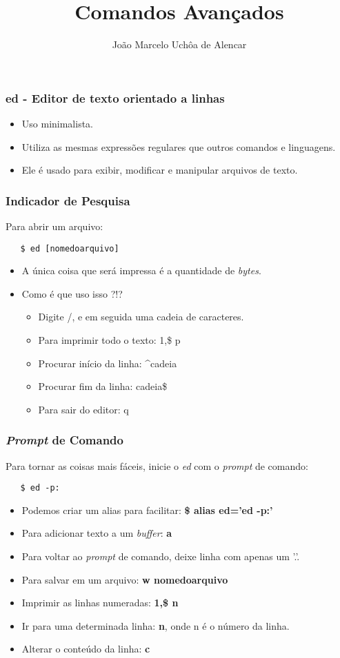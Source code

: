 \documentclass{beamer}
\title{Comandos Avançados}
\author[João Marcelo Uchôa de Alencar]{João Marcelo Uchôa de Alencar}
\institute{Universidade Federal do Ceará - Quixadá}
\begin{document}
   \begin{frame}
      \titlepage
   \end{frame}

   \begin{frame}
      \frametitle{ed - Editor de texto orientado a linhas}
      \begin{itemize}
         \item Uso minimalista. 
         \item Utiliza as mesmas expressões regulares que outros comandos e linguagens.
	 \item Ele é usado para exibir, modificar e manipular arquivos de texto. 
      \end{itemize}
   \end{frame}

\begin{frame}[fragile]
   \frametitle{Indicador de Pesquisa}
   Para abrir um arquivo: 
   \begin{verbatim}
   $ ed [nomedoarquivo] 
   \end{verbatim}
   \begin{itemize}
      \item A única coisa que será impressa é a quantidade de \textit{bytes}. 
      \item Como é que uso isso ?!? 
      \begin{itemize}
         \item Digite \slash, e em seguida uma cadeia de caracteres. 
         \item Para imprimir todo o texto: 1,\$ p 
         \item Procurar início da linha: \^{}cadeia 
         \item Procurar fim da linha: cadeia\$ 
         \item Para sair do editor: q
      \end{itemize} 
   \end{itemize}
\end{frame}

\begin{frame}[fragile]
   \frametitle{\textit{Prompt} de Comando}
   Para tornar as coisas mais fáceis, inicie o \textit{ed} com o \textit{prompt} de comando: 
   \begin{verbatim}
   $ ed -p:
   \end{verbatim}
   \begin{itemize}
      \item Podemos criar um alias para facilitar: \textbf{\$ alias ed='ed -p:'} 
      \item Para adicionar texto a um \textit{buffer}: \textbf{a} 
      \item Para voltar ao \textit{prompt} de comando, deixe linha com apenas um '.'. 
      \item Para salvar em um arquivo: \textbf{w nomedoarquivo} 
      \item Imprimir as linhas numeradas: \textbf{1,\$ n} 
      \item Ir para uma determinada linha: \textbf{n}, onde n é o número da linha. 
      \item Alterar o conteúdo da linha: \textbf{c}
   \end{itemize}
\end{frame}
\end{document}
